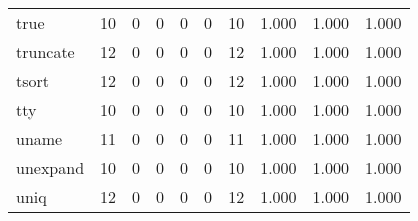 \begin{longtable}{lp{2.0cm}p{2.0cm}p{2.0cm}p{2.0cm}p{2.0cm}p{2.0cm}p{2.0cm}p{2.0cm}p{2.0cm}}
true      &                     10 &                                             0 &                                            0 &                                           0 &                                            0 &                                         10 &                                1.000 &                                  1.000 &                                1.000 \\
truncate  &                     12 &                                             0 &                                            0 &                                           0 &                                            0 &                                         12 &                                1.000 &                                  1.000 &                                1.000 \\
tsort     &                     12 &                                             0 &                                            0 &                                           0 &                                            0 &                                         12 &                                1.000 &                                  1.000 &                                1.000 \\
tty       &                     10 &                                             0 &                                            0 &                                           0 &                                            0 &                                         10 &                                1.000 &                                  1.000 &                                1.000 \\
uname     &                     11 &                                             0 &                                            0 &                                           0 &                                            0 &                                         11 &                                1.000 &                                  1.000 &                                1.000 \\
unexpand  &                     10 &                                             0 &                                            0 &                                           0 &                                            0 &                                         10 &                                1.000 &                                  1.000 &                                1.000 \\
uniq      &                     12 &                                             0 &                                            0 &                                           0 &                                            0 &                                         12 &                                1.000 &                                  1.000 &                                1.000 \\

\end{longtable}
